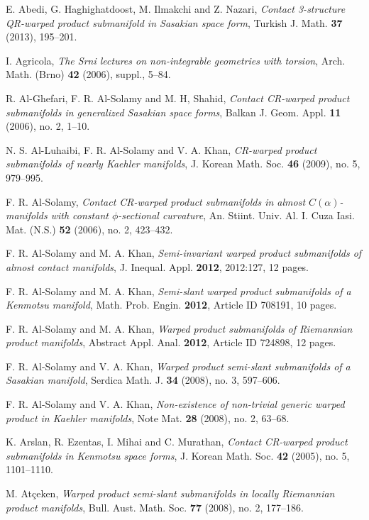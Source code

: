 \documentclass{amsart}
\theoremstyle{plain}
\numberwithin{equation}{section}
\theoremstyle{remark}
\numberwithin{equation}{section}
\begin{document}
\begin{thebibliography}{120}

 E. Abedi, G. Haghighatdoost, M. Ilmakchi and Z. Nazari, {\it Contact 3-structure QR-warped product submanifold in Sasakian space form}, Turkish J. Math. {\bf 37} (2013), 195--201.

 I. Agricola,  {\it The Srni lectures on non-integrable geometries with torsion},  Arch. Math. (Brno) {\bf 42} (2006), suppl., 5--84. 

 R.  Al-Ghefari, F. R. Al-Solamy and M. H, Shahid,  {\it Contact CR-warped product submanifolds in generalized Sasakian space forms}, Balkan J. Geom. Appl. {\bf 11} (2006), no. 2, 1--10.

 N. S. Al-Luhaibi,  F. R. Al-Solamy and V. A. Khan, {\it CR-warped product submanifolds of nearly Kaehler manifolds}, J. Korean Math. Soc. {\bf 46} (2009), no. 5, 979--995. 

 F. R. Al-Solamy, {\it Contact CR-warped product submanifolds in almost $C(\alpha)$-manifolds with constant $\phi$-sectional curvature}, An. Stiint. Univ. Al. I. Cuza Iasi. Mat. (N.S.) {\bf 52} (2006), no. 2, 423--432.

 F. R. Al-Solamy and M. A. Khan, {\it Semi-invariant warped product submanifolds of almost contact manifolds}, J. Inequal. Appl. {\bf 2012}, 2012:127, 12 pages.

 F. R. Al-Solamy and M. A. Khan, {\it Semi-slant warped product submanifolds of a Kenmotsu manifold}, Math. Prob. Engin. {\bf 2012}, Article ID 708191, 10 pages.

 F. R. Al-Solamy and M. A. Khan, {\it Warped product submanifolds of Riemannian product manifolds}, Abstract Appl.  Anal. {\bf 2012}, Article ID 724898, 12 pages.

 F. R. Al-Solamy and V. A. Khan, {\it  Warped product semi-slant submanifolds of a Sasakian manifold}, Serdica Math. J. {\bf 34} (2008), no. 3, 597--606.

 F. R. Al-Solamy and V. A. Khan, {\it  Non-existence of non-trivial generic warped product in Kaehler manifolds}, Note Mat. {\bf 28} (2008), no. 2, 63--68.

 K. Arslan,  R. Ezentas, I. Mihai and C. Murathan, {\it Contact CR-warped product submanifolds in Kenmotsu space forms}, J. Korean Math. Soc. {\bf 42} (2005), no. 5, 1101--1110.

 M. At\c{c}eken, {\it  Warped product semi-slant submanifolds in locally Riemannian product manifolds}, Bull. Aust. Math. Soc. {\bf 77} (2008), no. 2, 177--186.


\end{thebibliography}
\end{document}
